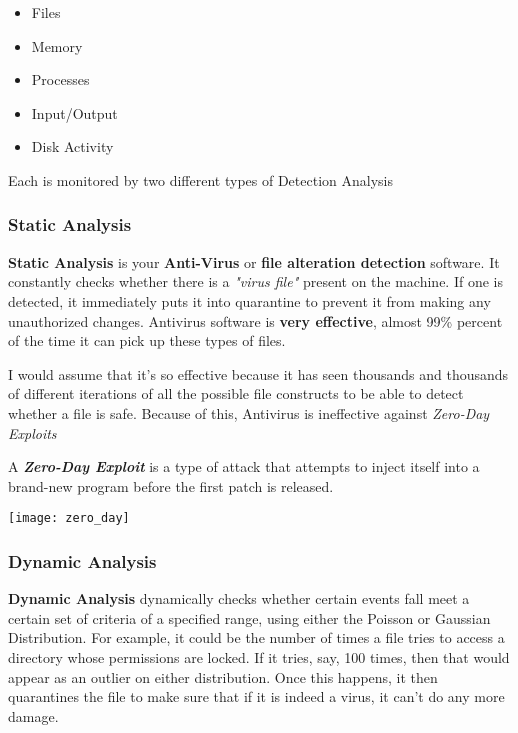 \begin{itemize}
    \item Files
    \item Memory
    \item Processes
    \item Input/Output
    \item Disk Activity
\end{itemize}


Each is monitored by two different types of Detection Analysis

\subsubsection{Static Analysis}

\textbf{Static Analysis} is your \textbf{Anti-Virus} or \textbf{file alteration
detection} software. It constantly checks whether there is a \textit{"virus
file"} present on the machine. If one is detected, it immediately puts it into
quarantine to prevent it from making any unauthorized changes. Antivirus
software is \textbf{very effective}, almost 99\% percent of the time it can pick
up these types of files.

I would assume that it's so effective because it has seen thousands and
thousands of different iterations of all the possible file constructs to be able
to detect whether a file is safe. Because of this, Antivirus is ineffective
against \textit{Zero-Day Exploits} \newline

\begin{tcolorbox}[mybox] A \textbf{\textit{Zero-Day Exploit}} is a type of
attack that attempts to inject itself into a brand-new program before the first
patch is released.


\begin{center} \texttt{[image: zero\_day]} \end{center}

\end{tcolorbox}

\subsubsection{Dynamic Analysis} \textbf{Dynamic Analysis} dynamically checks
whether certain events fall meet a certain set of criteria  of a specified
range, using either the Poisson or Gaussian Distribution. For example, it could
be the number of times a file tries to access a directory whose permissions are
locked. If it tries, say, 100 times, then that would appear as an outlier on
either distribution.  Once this happens, it then quarantines the file to make
sure that if it is indeed a virus, it can't do any more damage.


